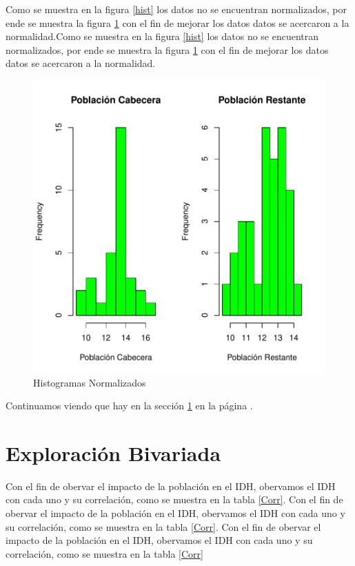 \documentclass{article}
\begin{document}
Como se muestra en la figura \ref{hist} los datos no se encuentran normalizados, por ende se muestra la figura \ref{histnorm} con el fin de mejorar los datos datos se acercaron a la normalidad.Como se muestra en la figura \ref{hist} los datos no se encuentran normalizados, por ende se muestra la figura \ref{histnorm} con el fin de mejorar los datos datos se acercaron a la normalidad.

\begin{figure}[h]
\centering
\begin{adjustbox}{width=7cm,height=7cm,clip,trim=1.5cm 0.5cm 0cm 1.5cm}
\includegraphics{ProyectoFinal-histnorm}
\end{adjustbox}
\caption{Histogramas Normalizados}
\label{histnorm}
\end{figure}

Continuamos viendo que hay en la sección \ref{bivariada} en la página \pageref{bivariada}.

\section{Exploración Bivariada}\label{bivariada}

Con el fin de obervar el impacto de la población en el IDH, obervamos el IDH con cada uno y su correlación, como se muestra en la tabla \ref{Corr}. Con el fin de obervar el impacto de la población en el IDH, obervamos el IDH con cada uno y su correlación, como se muestra en la tabla \ref{Corr}. Con el fin de obervar el impacto de la población en el IDH, obervamos el IDH con cada uno y su correlación, como se muestra en la tabla \ref{Corr}
\end{document}
